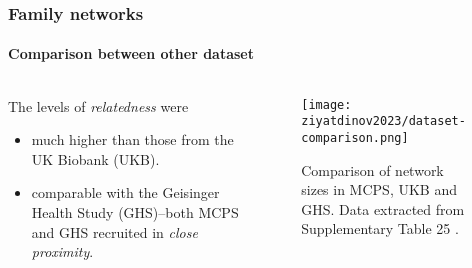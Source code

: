 \begin{frame}
    \frametitle{Family networks}
    \framesubtitle{Comparison between other dataset}
    \begin{columns}
        \begin{column}{0.5\textwidth}

            The levels of \textit{relatedness} were
            \begin{itemize}[label=$\bullet$,noitemsep,topsep=5pt]
                \item  much higher than those from the \textcolor{tertiary-color}{UK Biobank (UKB)}.
                \item comparable with the \textcolor{secondary-color}{Geisinger Health Study (GHS)}--both \textcolor{primary-color}{MCPS} and \textcolor{secondary-color}{GHS} recruited in \textit{close proximity}.
            \end{itemize}
        \end{column}
        \begin{column}{0.5\textwidth}
            \begin{figure}[htpb]
                \centering
                \texttt{[image: ziyatdinov2023/dataset-comparison.png]}
                \caption{Comparison of network sizes in MCPS, UKB and GHS. Data extracted from Supplementary Table 25 \parencite{ziyatdinov2023}.}
                \label{fig:label}
            \end{figure}
        \end{column}
    \end{columns}
\end{frame}

